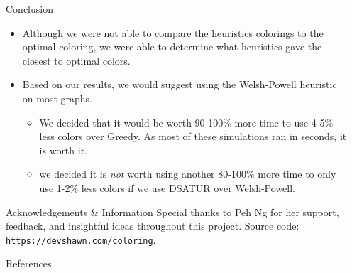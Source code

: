 \documentclass[final]{beamer}
\newlength{\sepwid}
\newlength{\onecolwid}
\begin{document}
\begin{frame}[t]
\begin{columns}[t]
\begin{column}{\onecolwid}
    \begin{block}{Conclusion}
      \begin{itemize}
        \item Although we were not able to compare the heuristics colorings to the optimal coloring, we were able to determine what heuristics gave the closest to optimal colors.
        \item Based on our results, we would suggest using the Welsh-Powell heuristic on most graphs.
        \begin{itemize}
          \item We decided that it would be worth 90-100\% more time to use 4-5\% less colors over Greedy. As most of these simulations ran in seconds, it is worth it.
          \item we decided it is \emph{not} worth using another 80-100\% more time to only use 1-2\% less colors if we use DSATUR over Welsh-Powell.
        \end{itemize}
      \end{itemize}
    \end{block}

    \begin{block}{Acknowledgements \& Information}
      \small{Special thanks to Peh Ng for her support, feedback, and insightful ideas throughout this project. Source code: \texttt{\footnotesize https://devshawn.com/coloring}.}
    \end{block}

    \begin{block}{References}
      \footnotesize{}
    \end{block}

  \end{column}
  \begin{column}{\sepwid}\end{column}			%
 \end{columns}
\end{frame}
\end{document}
